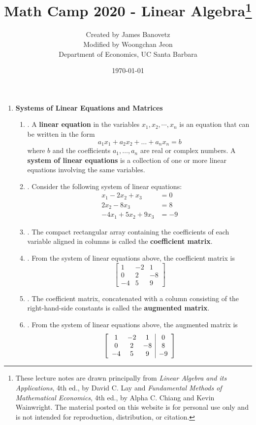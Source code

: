 \documentclass[12pt]{article}
\title{Math Camp 2020 - Linear Algebra\footnote{These lecture notes are drawn principally from \emph{Linear Algebra and its Applications}, 4th ed., by David C. Lay and \emph{Fundamental Methods of Mathematical Economics}, 4th ed., by Alpha C. Chiang and Kevin Wainwright. The material posted on this website is for personal use only and
		is not intended for reproduction, distribution, or citation.}
}
\date{\normalsize \today}
\author{\normalsize Created by James Banovetz \\ { \normalsize Modified by Woongchan Jeon } \\[12pt] \normalsize Department of Economics, UC Santa Barbara}
\begin{document}
\maketitle

\begin{enumerate}

\item\textbf{Systems of Linear Equations and Matrices}
	\begin{enumerate}
	\item\underline{}.
		A \textbf{linear equation} in the variables $x_1,x_2,\cdots,x_n$ is an equation that can be written in the form
			\[a_1x_1+a_2x_2+\dots+a_nx_n = b\]
		where $b$ and the coefficients $a_1,\dots,a_n$ are real or complex numbers. A \textbf{system of linear equations} is a collection of one or more linear equations involving the same variables.

	\item\underline{}.
		Consider the following system of linear equations:
			\begin{align*}
				x_1 - 2x_2 + x_3 & = 0 \\
				2x_2 - 8x_3 & = 8 \\
				-4x_1+5x_2+9x_3 & = -9
			\end{align*}

	\item\underline{}.
		The compact rectangular array containing the coefficients of each variable aligned in columns
		is called the \textbf{coefficient matrix}.

	\item\underline{}.
		From the system of linear equations above, the coefficient matrix is
			\[\begin{bmatrix}
				1	&-2	&1	\\
				0	&2	&-8	\\
				-4	&5	&9
			\end{bmatrix}\]

	\item\underline{}.
		The coefficient matrix, concatenated with a column consisting of the right-hand-side constants
		is called the \textbf{augmented matrix}.
	
	\item\underline{}.
		From the system of linear equations above, the augmented matrix is
			\[\left[\begin{array}{c c c | c}
				1	&-2	&1	&0	\\
				0	&2	&-8	&8	\\
				-4	&5	&9	&-9
			\end{array}\right]\]


\end{enumerate}
\end{enumerate}
\end{document}
